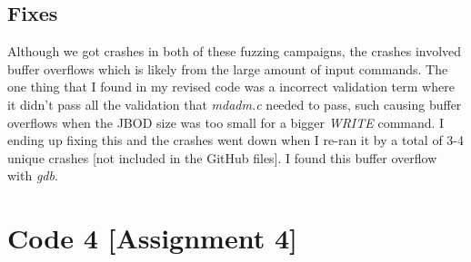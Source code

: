 \documentclass[11pt]{article}
\begin{document}
\subsection{Fixes}
Although we got crashes in both of these fuzzing campaigns, the crashes involved buffer overflows which is likely from the large amount of input commands. The one thing that I found in my revised code was a incorrect validation term where it didn't pass all the validation that \textit{mdadm.c} needed to pass, such causing buffer overflows when the JBOD size was too small for a bigger \textit{WRITE} command. I ending up fixing this and the crashes went down when I re-ran it by a total of 3-4 unique crashes [not included in the GitHub files]. I found this buffer overflow with \textit{gdb}.  

\newpage

\section{Code 4 [Assignment 4]}
\end{document}

